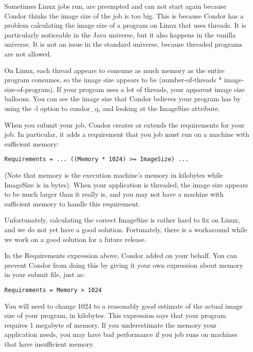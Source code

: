 
Sometimes Linux jobs run, are preempted and can not start again because
Condor thinks the image size of the job is too big. This is because
Condor has a problem calculating the image size of a program on Linux
that uses threads. It is particularly noticeable in the Java universe,
but it also happens in the vanilla universe. It is not an issue in the
standard universe, because threaded programs are not allowed.

On Linux, each thread appears to consume as much memory as the entire
program consumes, so the image size appears to be (number-of-threads *
image-size-of-program). If your program uses a lot of threads, your
apparent image size balloons. You can see the image size that Condor
believes your program has by using the -l option to condor\_q, and
looking at the ImageSize attribute.

When you submit your job, Condor creates or extends the requirements
for your job. In particular, it adds a requirement that you job must
run on a machine with sufficient memory:

\begin{verbatim}
Requirements = ... ((Memory * 1024) >= ImageSize) ...
\end{verbatim}

(Note that memory is the execution machine's memory in kilobytes while
ImageSize is in bytes). When your application is threaded, the
image size appears to be much larger than it really is, and you may not
have a machine with sufficient memory to handle this requirement.

Unfortunately, calculating the correct ImageSize is rather hard to fix
on Linux, and we do not yet have a good solution. Fortunately, there
is a workaround while we work on a good solution for a future
release.

In the Requirements expression above, Condor added  on your behalf. You can prevent Condor from doing this by
giving it your own expression about memory in your submit file, just
as:

\begin{verbatim}
Requirements = Memory > 1024
\end{verbatim}

You will need to change 1024 to a reasonably good estimate of the actual
image size of your program, in kilobytes. This expression says that
your program requires 1 megabyte of memory. If you underestimate the
memory your application needs, you may have bad performance if you job
runs on machines that have insufficient memory.

